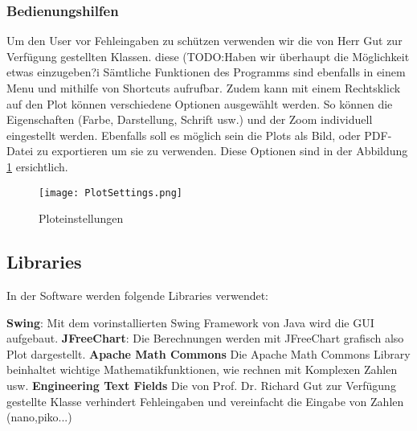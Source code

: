 \subsubsection{Bedienungshilfen}\label{subsubsec:bedienungshilfen}
Um den User vor Fehleingaben zu schützen verwenden wir die von Herr Gut zur Verfügung gestellten Klassen. diese (TODO:Haben wir überhaupt die Möglichkeit etwas einzugeben?^^)
Sämtliche Funktionen des Programms sind ebenfalls in einem Menu und mithilfe von Shortcuts aufrufbar.
Zudem kann mit einem Rechtsklick auf den Plot können verschiedene Optionen ausgewählt werden. So können die Eigenschaften (Farbe, Darstellung, Schrift usw.) und der Zoom individuell eingestellt werden. Ebenfalls soll es möglich sein die Plots als Bild, oder PDF-Datei zu exportieren um sie zu verwenden. Diese Optionen sind in der Abbildung \ref{fig:PlotSettings} ersichtlich.
\begin{figure}[H]
	\centering
	\texttt{[image: PlotSettings.png]}
	\caption{Ploteinstellungen}
	\label{fig:PlotSettings}
\end{figure} 
\bigskip


\begin{comment}
\paragraph{Simulation} \label{para:simulation}
Im Menupunkt "Simulation" kann die Simulationsart Monte Carlo ausgewählt werden(F8, Tabelle:\ref{tab:ziele}). Es öffnet sich ein neues Fenster in dem der Parameter, die Toleranz und die Anzahl Messungen eingestellt werden kann. Dieser Menupunkt ist in der Abbildung \ref{fig:GUISimulation} dargestellt.

\begin{figure}[H]
	\centering
	\texttt{[image: GUISimulation.png]}
	\caption{Menuoption Simulation}
	\label{fig:GUISimulation}
\end{figure}
\end{comment}

\subsection{Libraries} \label{subsec:Libraries}

In der Software werden folgende Libraries verwendet:

\textbf{Swing}: Mit dem vorinstallierten Swing Framework von Java wird die GUI aufgebaut.
\textbf{JFreeChart}: Die Berechnungen werden mit JFreeChart grafisch also Plot dargestellt. \cite{jfreechart}
\textbf{Apache Math Commons} Die Apache Math Commons Library beinhaltet wichtige Mathematikfunktionen, wie rechnen mit Komplexen Zahlen usw. \cite{apache}
\textbf{Engineering Text Fields} Die von Prof. Dr. Richard Gut zur Verfügung gestellte Klasse verhindert Fehleingaben und vereinfacht die Eingabe von Zahlen (nano,piko...)

\newpage
